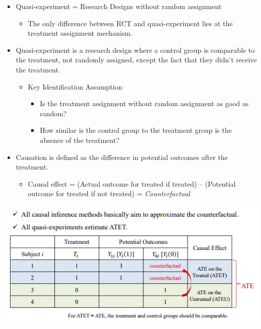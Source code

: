 \documentclass[
]{book}
\providecommand{\tightlist}{%
  \setlength{\itemsep}{0pt}\setlength{\parskip}{0pt}}
\theoremstyle{definition}
\theoremstyle{definition}
\theoremstyle{definition}
\theoremstyle{definition}
\theoremstyle{remark}
\begin{document}
\begin{itemize}
\tightlist
\item
  Quasi-experiment = Research Designs without random assignment

  \begin{itemize}
  \tightlist
  \item
    The only difference between RCT and quasi-experiment lies at the treatment assignment mechanism.
  \end{itemize}
\item
  Quasi-experiment is a research design where a control group is comparable to the treatment, not randomly assigned, except the fact that they didn't receive the treatment.

  \begin{itemize}
  \tightlist
  \item
    Key Identification Assumption

    \begin{itemize}
    \tightlist
    \item
      Is the treatment assignment without random assignment as good as random?
    \item
      How similar is the control group to the treatment group is the absence of the treatment?
    \end{itemize}
  \end{itemize}
\item
  Causation is defined as the difference in potential outcomes after the treatment.

  \begin{itemize}
  \tightlist
  \item
    Causal effect = (Actual outcome for treated if treated) -- (Potential outcome for treated if not treated) = \emph{Counterfactual}
  \end{itemize}
\end{itemize}

\includegraphics{figures/23.png}
\end{document}
